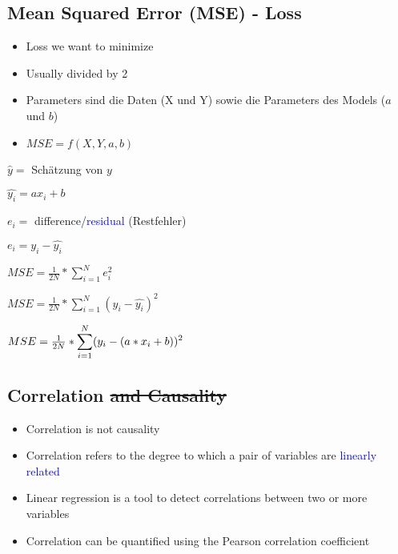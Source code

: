 \subsection{Mean Squared Error (MSE) - Loss}
\begin{itemize}
    \item Loss we want to minimize
    \item Usually divided by 2
    \item Parameters sind die Daten (X und Y) sowie die Parameters des Models ($a$ und $b$)
    \item $MSE = f (X, Y, a, b)$
\end{itemize}
\begin{center}
    $\hat{y} =$ Schätzung von $y$

    $\hat{y_i} = ax_i + b$

    $e_i =$ difference/\textcolor{blue}{residual} (Restfehler)

    $e_i = y_i - \hat{y_i}$

    $MSE = \frac{1}{2N} * \displaystyle\sum_{i = 1}^{N} e_i^2$

    $MSE = \frac{1}{2N} * \displaystyle\sum_{i = 1}^{N} (y_i - \hat{y_i})^2$

    $MSE = \frac{1}{2N} * \large\displaystyle\sum_{i = 1}^{N}({y_i} - (a*x_i + b))^2$
\end{center}

\subsection{Correlation \sout{and Causality}}
\begin{itemize}
    \item Correlation is not causality
    \item Correlation refers to the degree to which a pair of variables are \textcolor{blue}{linearly related}
    \item Linear regression is a tool to detect correlations between two or more variables
    \item Correlation can be quantified using the Pearson correlation coefficient
\end{itemize}
